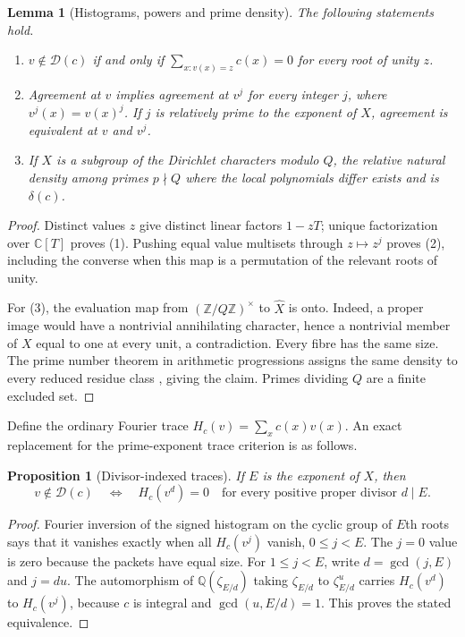 \documentclass[11pt]{article}
\newtheorem{lemma}[theorem]{Lemma}
\newtheorem{proposition}[theorem]{Proposition}
\theoremstyle{definition}
\theoremstyle{remark}
\newcommand{\Z}{\mathbb Z}
\newcommand{\C}{\mathbb C}
\newcommand{\Q}{\mathbb Q}
\begin{document}
\begin{lemma}[Histograms, powers and prime density]\label{lem:histograms}
The following statements hold.
\begin{enumerate}
\item $v\notin\mathcal D(c)$ if and only if $\sum_{x:v(x)=z}c(x)=0$ for every root of unity $z$.
\item Agreement at $v$ implies agreement at $v^j$ for every integer $j$, where $v^j(x)=v(x)^j$. If $j$ is relatively prime to the exponent of $X$, agreement is equivalent at $v$ and $v^j$.
\item If $X$ is a subgroup of the Dirichlet characters modulo $Q$, the relative natural density among primes $p\nmid Q$ where the local polynomials differ exists and is $\delta(c)$.
\end{enumerate}
\end{lemma}
\begin{proof}
Distinct values $z$ give distinct linear factors $1-zT$; unique factorization over $\C[T]$ proves (1). Pushing equal value multisets through $z\mapsto z^j$ proves (2), including the converse when this map is a permutation of the relevant roots of unity.

For (3), the evaluation map from $(\Z/Q\Z)^\times$ to $\widehat X$ is onto. Indeed, a proper image would have a nontrivial annihilating character, hence a nontrivial member of $X$ equal to one at every unit, a contradiction. Every fibre has the same size. The prime number theorem in arithmetic progressions assigns the same density to every reduced residue class \cite{davenport}, giving the claim. Primes dividing $Q$ are a finite excluded set.
\end{proof}

Define the ordinary Fourier trace $H_c(v)=\sum_x c(x)v(x)$. An exact replacement for the prime-exponent trace criterion is as follows.

\begin{proposition}[Divisor-indexed traces]\label{prop:divisor-traces}
If $E$ is the exponent of $X$, then
\[
 v\notin\mathcal D(c)
 \quad\Longleftrightarrow\quad
 H_c(v^d)=0\quad\text{for every positive proper divisor }d\mid E.
\]
\end{proposition}
\begin{proof}
Fourier inversion of the signed histogram on the cyclic group of $E$th roots says that it vanishes exactly when all $H_c(v^j)$ vanish, $0\le j<E$. The $j=0$ value is zero because the packets have equal size. For $1\le j<E$, write $d=\gcd(j,E)$ and $j=du$. The automorphism of $\Q(\zeta_{E/d})$ taking $\zeta_{E/d}$ to $\zeta_{E/d}^{u}$ carries $H_c(v^d)$ to $H_c(v^j)$, because $c$ is integral and $\gcd(u,E/d)=1$. This proves the stated equivalence.
\end{proof}
\end{document}
